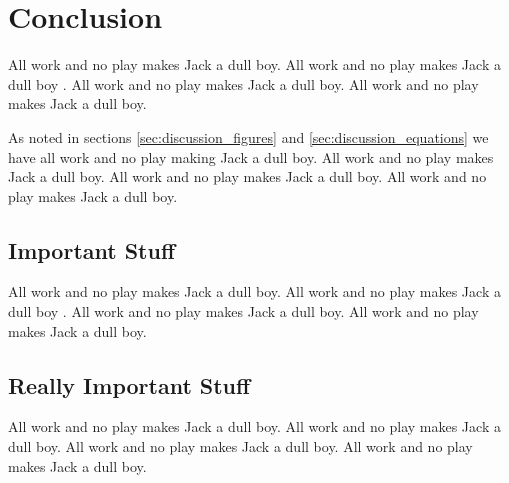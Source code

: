 
%
%

%
%

\section{Conclusion}
\label{sec:conclusion}

All work and no play makes Jack a dull boy.
All work and no play makes Jack a dull boy \cite{knuth-website}.
All work and no play makes Jack a dull boy.
All work and no play makes Jack a dull boy.

As noted in sections
\ref{sec:discussion_figures} and
\ref{sec:discussion_equations}
we have all work and no play making Jack a dull boy.
All work and no play makes Jack a dull boy.
All work and no play makes Jack a dull boy.
All work and no play makes Jack a dull boy.

\subsection{Important Stuff}
\label{sec:conclusions_important_stuff}

All work and no play makes Jack a dull boy.
All work and no play makes Jack a dull boy
\cite{einstein-electrodynamics,
knuth-website,
knuth-fundamental-algorithms,
dirac-quantum-mechanics}.
All work and no play makes Jack a dull boy.
All work and no play makes Jack a dull boy.

\subsection{Really Important Stuff}
\label{sec:conclusions_really_important_stuff}

All work and no play makes Jack a dull boy.
All work and no play makes Jack a dull boy.
All work and no play makes Jack a dull boy.
All work and no play makes Jack a dull boy.
